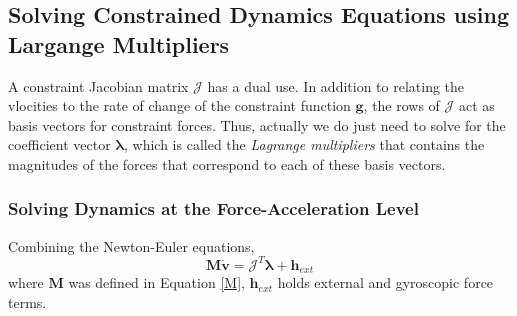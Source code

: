     \subsection{Solving Constrained Dynamics Equations using Largange Multipliers}
        A constraint Jacobian matrix $\mathcal{J}$ has a dual use. In addition to relating the vlocities to the rate of change of the constraint function $\pmb{g}$, the rows of $\mathcal{J}$ act as basis vectors for constraint forces. Thus, actually we do just need to solve for the coefficient vector $\pmb{\lambda}$, which is called the \textit{Lagrange multipliers} that contains the magnitudes of the forces that correspond to each of these basis vectors.

        \subsubsection{Solving Dynamics at the Force-Acceleration Level}
        Combining the Newton-Euler equations,
        \begin{equation}
            \pmb{M}\dot{\mathbf{v}} = \mathcal{J}^{T}\pmb{\lambda} + \mathbf{h}_{ext}
        \end{equation}
        where $\pmb{M}$ was defined in Equation \ref{M}, $\mathbf{h}_{ext}$ holds external and gyroscopic force terms. 


